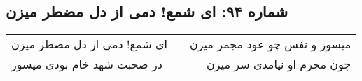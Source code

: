 \begin{center}
\section*{شماره ۹۴: ای شمع! دمی از دل مضطر میزن}
\label{sec:094}
\begin{longtable}{l p{0.5cm} r}
ای شمع! دمی از دل مضطر میزن
&&
میسوز و نفس چو عود مجمر میزن
\\
در صحبت شهد خام بودی میسوز
&&
چون محرم او نیامدی سر میزن
\\
\end{longtable}
\end{center}
